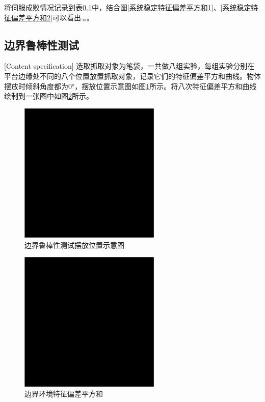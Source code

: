 \documentclass[fontset=fandol,type=bachelor,campus=harbin,bsmainpagenumberline=true]{hithesisbook}
\begin{document}
将伺服成败情况记录到表\ref{}中，结合图\ref{系统稳定特征偏差平方和1}、\ref{系统稳定特征偏差平方和2}可以看出.。。
\subsection{边界鲁棒性测试}[Content specification]
选取抓取对象为笔袋，一共做八组实验，每组实验分别在平台边缘处不同的八个位置放置抓取对象，记录它们的特征偏差平方和曲线。物体摆放时倾斜角度都为0°，摆放位置示意图如图\ref{边界鲁棒性测试摆放位置示意图}所示。将八次特征偏差平方和曲线绘制到一张图中如图\ref{边界环境特征偏差平方和}所示。
\begin{figure}[h]
	\centering
	\includegraphics[width=0.6\textwidth]{chapter6/替身}
	\caption{边界鲁棒性测试摆放位置示意图}
	\label{边界鲁棒性测试摆放位置示意图}
\end{figure}

\begin{figure}[h]
	\centering
	\includegraphics[width=0.6\textwidth]{chapter6/替身}
	\caption{边界环境特征偏差平方和}
	\label{边界环境特征偏差平方和}
\end{figure}
\end{document}
